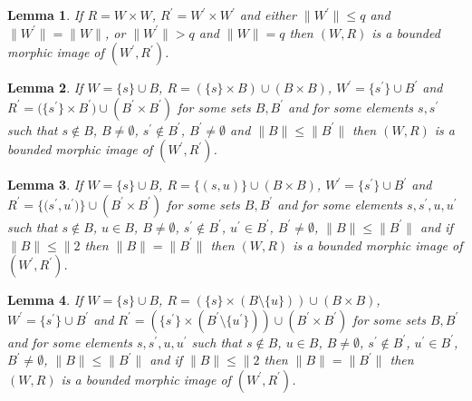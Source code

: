 \documentclass[draft]{article}
\newtheorem{lemma}{Lemma}
\begin{document}
%
%
\begin{lemma}\label{lemma:about:partitions:q:greater:smaller}
%
%
If $R{=}W{\times}W$, $R^{\prime}{=}W^{\prime}{\times}W^{\prime}$ and either ${\parallel}W^{\prime}{\parallel}{\leq}q$ and ${\parallel}W^{\prime}{\parallel}{=}{\parallel}W{\parallel}$, or ${\parallel}W^{\prime}{\parallel}{>}q$ and ${\parallel}W{\parallel}{=}q$ then $(W,R)$ is a bounded morphic image of $(W^{\prime},R^{\prime})$.
%
%
\end{lemma}
%
%
\begin{lemma}\label{lemma:inclusion:Bprime:B:for:generated:subframes:is:bmi}
%
%
If $W{=}\{s\}{\cup}B$, $R{=}(\{s\}{\times}B){\cup}(B{\times}B)$, $W^{\prime}{=}\{s^{\prime}\}{\cup}B^{\prime}$ and $R^{\prime}{=}(\{s^{\prime}\}{\times}
%
%
%
%
%
%
%
%
%
%
%
%
$\linebreak$
%
%
%
%
%
%
%
%
%
%
%
%
B^{\prime}){\cup}(B^{\prime}{\times}B^{\prime})$ for some sets $B,B^{\prime}$ and for some elements $s,s^{\prime}$ such that $s{\not\in}B$, $B{\not=}\emptyset$, $s^{\prime}{\not\in}B^{\prime}$, $B^{\prime}{\not=}\emptyset$ and ${\parallel}B{\parallel}{\leq}{\parallel}B^{\prime}{\parallel}$ then $(W,R)$ is a bounded morphic image of $(W^{\prime},R^{\prime})$.
%
%
\end{lemma}
%
%
\begin{lemma}\label{lemma:inclusion:Bprime:B:for:generated:subframes:is:bmi:bis}
%
%
If $W{=}\{s\}{\cup}B$, $R{=}\{(s,u)\}{\cup}(B{\times}B)$, $W^{\prime}{=}\{s^{\prime}\}{\cup}B^{\prime}$ and $R^{\prime}{=}\{(s^{\prime},
%
%
%
%
%
%
%
%
%
%
%
%
$\linebreak$
%
%
%
%
%
%
%
%
%
%
%
%
u^{\prime})\}{\cup}(B^{\prime}{\times}B^{\prime})$ for some sets $B,B^{\prime}$ and for some elements $s,s^{\prime},u,u^{\prime}$ such that $s{\not\in}B$, $u{\in}B$, $B{\not=}\emptyset$, $s^{\prime}{\not\in}B^{\prime}$, $u^{\prime}{\in}B^{\prime}$, $B^{\prime}{\not=}\emptyset$, ${\parallel}B{\parallel}{\leq}{\parallel}B^{\prime}{\parallel}$ and if ${\parallel}B{\parallel}{\leq}{\parallel}2$ then ${\parallel}B{\parallel}{=}
%
%
%
%
%
%
%
%
%
%
%
%
$\linebreak$
%
%
%
%
%
%
%
%
%
%
%
%
{\parallel}B^{\prime}{\parallel}$ then $(W,R)$ is a bounded morphic image of $(W^{\prime},R^{\prime})$.
%
%
\end{lemma}
%
%
\begin{lemma}\label{lemma:inclusion:Bprime:B:for:generated:subframes:is:bmi:ter}
%
%
If $W{=}\{s\}{\cup}B$, $R{=}(\{s\}{\times}(B{\setminus}\{u\})){\cup}(B{\times}B)$, $W^{\prime}{=}\{s^{\prime}\}{\cup}B^{\prime}$ and $R^{\prime}{=}
%
%
%
%
%
%
%
%
%
%
%
%
$\linebreak$
%
%
%
%
%
%
%
%
%
%
%
%
(\{s^{\prime}\}{\times}(B^{\prime}{\setminus}\{u^{\prime}\})){\cup}(B^{\prime}{\times}B^{\prime})$ for some sets $B,B^{\prime}$ and for some elements $s,s^{\prime},u,u^{\prime}$ such that $s{\not\in}B$, $u{\in}B$, $B{\not=}\emptyset$, $s^{\prime}{\not\in}B^{\prime}$, $u^{\prime}{\in}B^{\prime}$, $B^{\prime}{\not=}\emptyset$, ${\parallel}B{\parallel}{\leq}{\parallel}B^{\prime}{\parallel}$ and if ${\parallel}B{\parallel}{\leq}{\parallel}2$ then ${\parallel}B{\parallel}{=}{\parallel}B^{\prime}{\parallel}$ then $(W,R)$ is a bounded morphic image of $(W^{\prime},R^{\prime})$.
%
%
\end{lemma}
\end{document}
